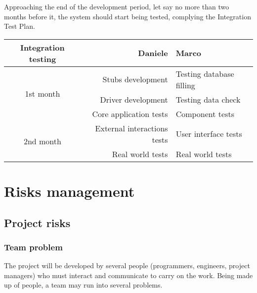 \documentclass{scrreprt}
\begin{document}
Approaching the end of the development period, let say no more than two months before it, the system should start being tested, complying the Integration Test Plan.

\begin{center}
\begin{tabular}{c|rl}
\toprule Integration testing & \textbf{Daniele} & \textbf{Marco} \\ \midrule
\multirow{ 3}{*}{1st month}&Stubs development&Testing database filling\\ 
&Driver development&Testing data check\\
&Core application tests&Component tests\\	 
\midrule
\multirow{ 2}{*}{2nd month} &External interactions tests&User interface tests\\
&Real world tests& Real world tests\\
\bottomrule
\end{tabular}
\end{center}

\chapter{Risks management}

\section{Project risks}

\subsection{Team problem}
The project will be developed by several people (programmers, engineers, project managers) who must interact and communicate to carry on the work. Being made up of people, a team may run into several problems.
\end{document}
